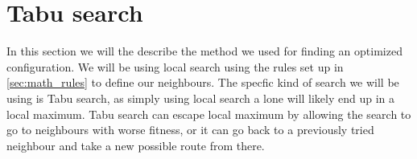 \section{Tabu search} \label{ch:tabu_search}
In this section we will the describe the method we used for finding an optimized configuration. We will be using local search using the rules set up in \cref{sec:math_rules} to define our neighbours. The specfic kind of search we will be using is Tabu search, as simply using local search a lone will likely end up in a local maximum. Tabu search can escape local maximum by allowing the search to go to neighbours with worse fitness, or it can go back to a previously tried neighbour and take a new possible route from there. 
